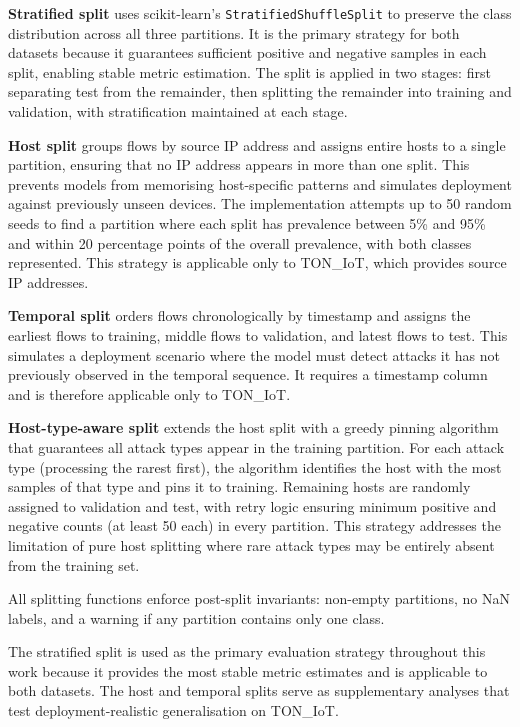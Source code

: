 \documentclass[12pt,a4paper]{report}
\begin{document}
\textbf{Stratified split} uses scikit-learn's \texttt{StratifiedShuffleSplit} to preserve the class distribution across all three partitions. It is the primary strategy for both datasets because it guarantees sufficient positive and negative samples in each split, enabling stable metric estimation. The split is applied in two stages: first separating test from the remainder, then splitting the remainder into training and validation, with stratification maintained at each stage.

\textbf{Host split} groups flows by source IP address and assigns entire hosts to a single partition, ensuring that no IP address appears in more than one split. This prevents models from memorising host-specific patterns and simulates deployment against previously unseen devices. The implementation attempts up to 50 random seeds to find a partition where each split has prevalence between 5\% and 95\% and within 20 percentage points of the overall prevalence, with both classes represented. This strategy is applicable only to TON\_IoT, which provides source IP addresses.

\textbf{Temporal split} orders flows chronologically by timestamp and assigns the earliest flows to training, middle flows to validation, and latest flows to test. This simulates a deployment scenario where the model must detect attacks it has not previously observed in the temporal sequence. It requires a timestamp column and is therefore applicable only to TON\_IoT.

\textbf{Host-type-aware split} extends the host split with a greedy pinning algorithm that guarantees all attack types appear in the training partition. For each attack type (processing the rarest first), the algorithm identifies the host with the most samples of that type and pins it to training. Remaining hosts are randomly assigned to validation and test, with retry logic ensuring minimum positive and negative counts (at least 50 each) in every partition. This strategy addresses the limitation of pure host splitting where rare attack types may be entirely absent from the training set.

All splitting functions enforce post-split invariants: non-empty partitions, no NaN labels, and a warning if any partition contains only one class.

The stratified split is used as the primary evaluation strategy throughout this work because it provides the most stable metric estimates and is applicable to both datasets. The host and temporal splits serve as supplementary analyses that test deployment-realistic generalisation on TON\_IoT.
\end{document}
